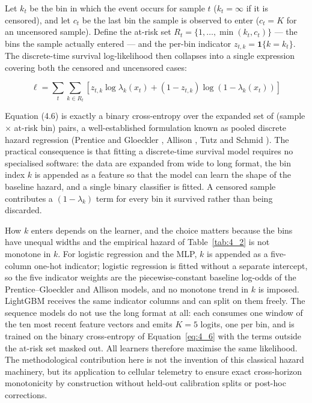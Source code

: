 Let $k_t$ be the bin in which the event occurs for sample $t$ ($k_t = \infty$ if it is censored), and let $c_t$ be the last bin the sample is observed to enter ($c_t = K$ for an uncensored sample). Define the at-risk set $R_t = \{1, \dots, \min(k_t, c_t)\}$ --- the bins the sample actually entered --- and the per-bin indicator $z_{t,k} = \mathbf{1}\{k = k_t\}$. The discrete-time survival log-likelihood then collapses into a single expression covering both the censored and uncensored cases:


\begin{equation}\label{eq:4_6} \ell = \sum_t \sum_{k \in R_t} \left[ z_{t,k} \log \lambda_k(x_t) + (1 - z_{t,k}) \log (1 - \lambda_k(x_t)) \right] \end{equation}

Equation (4.6) is exactly a binary cross-entropy over the expanded set of (sample $\times$ at-risk bin) pairs, a well-established formulation known as pooled discrete hazard regression (Prentice and Gloeckler \cite{ref48}, Allison \cite{ref49}, Tutz and Schmid \cite{ref50}). The practical consequence is that fitting a discrete-time survival model requires no specialised software: the data are expanded from wide to long format, the bin index $k$ is appended as a feature so that the model can learn the shape of the baseline hazard, and a single binary classifier is fitted. A censored sample contributes a $(1 - \lambda_k)$ term for every bin it survived rather than being discarded.

How $k$ enters depends on the learner, and the choice matters because the bins have unequal widths and the empirical hazard of Table~\ref{tab:4_2} is not monotone in $k$. For logistic regression and the MLP, $k$ is appended as a five-column one-hot indicator; logistic regression is fitted without a separate intercept, so the five indicator weights are the piecewise-constant baseline log-odds of the Prentice--Gloeckler and Allison models, and no monotone trend in $k$ is imposed. LightGBM receives the same indicator columns and can split on them freely. The sequence models do not use the long format at all: each consumes one window of the ten most recent feature vectors and emits $K = 5$ logits, one per bin, and is trained on the binary cross-entropy of Equation~\eqref{eq:4_6} with the terms outside the at-risk set masked out. All learners therefore maximise the same likelihood. The methodological contribution here is not the invention of this classical hazard machinery, but its application to cellular telemetry to ensure exact cross-horizon monotonicity by construction without held-out calibration splits or post-hoc corrections.

